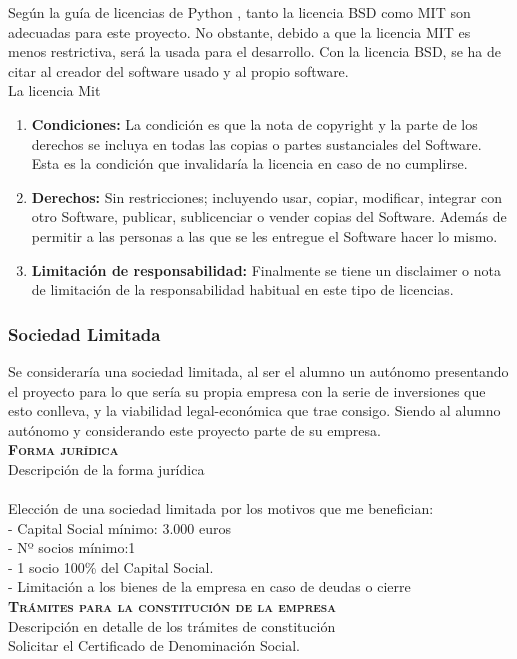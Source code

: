 Según la guía de licencias de Python \cite{licencias}, tanto la licencia BSD como MIT son adecuadas para este proyecto. No obstante, debido a que la licencia MIT es menos restrictiva, será la usada para el desarrollo. Con la licencia BSD, se ha de citar al creador del software usado y al propio software.\\
La licencia Mit \cite{mit}
\begin{enumerate}
\item \textbf{Condiciones:}  La condición es que la nota de copyright y la parte de los derechos se incluya en todas las copias o partes sustanciales del Software. Esta es la condición que invalidaría la licencia en caso de no cumplirse.
\item \textbf{Derechos:}  Sin restricciones; incluyendo usar, copiar, modificar, integrar con otro Software, publicar, sublicenciar o vender copias del Software. Además de permitir a las personas a las que se les entregue el Software hacer lo mismo.
\item \textbf{Limitación de responsabilidad:}  Finalmente se tiene un disclaimer o nota de limitación de la responsabilidad habitual en este tipo de licencias.
\end{enumerate}
\subsubsection{Sociedad Limitada}
Se consideraría una sociedad limitada, al ser el alumno un autónomo presentando el proyecto para lo que sería su propia empresa con la serie de inversiones que esto conlleva, y la viabilidad legal-económica que trae consigo.
Siendo al alumno autónomo y considerando este proyecto parte de su empresa.\\

\textbf{\textsc{Forma jurídica}}\\
Descripción de la forma jurídica\\
\\
Elección de una sociedad limitada por los motivos que me benefician:\\
- Capital Social mínimo: 3.000 euros  \\

- Nº socios mínimo:1 \\
- 1 socio 100\% del Capital Social.\\
- Limitación a los bienes de la empresa en caso de deudas o cierre \\


\textbf{\textsc{Trámites para la constitución de la empresa}}\\
Descripción en detalle de los trámites de constitución\\
Solicitar el Certificado de Denominación Social.\\

